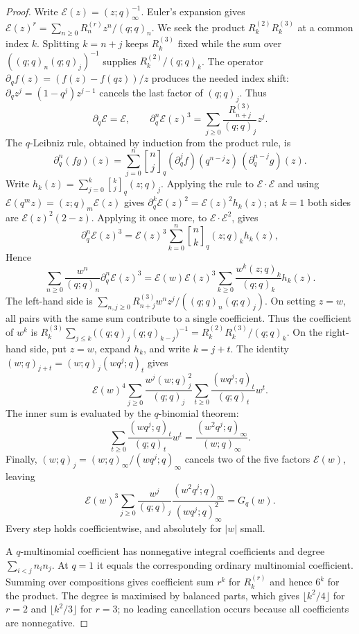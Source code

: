 \documentclass[11pt]{article}
\begin{document}
\begin{proof}
Write $\mathcal E(z)=(z;q)_\infty^{-1}$. Euler's expansion gives
$\mathcal E(z)^r=\sum_{n\ge0}R_n^{(r)}z^n/(q;q)_n$.
We seek the product $R_k^{(2)}R_k^{(3)}$ at a common index $k$.
Splitting $k=n+j$ keeps $R_k^{(3)}$ fixed while the sum over
$((q;q)_n(q;q)_j)^{-1}$ supplies $R_k^{(2)}/(q;q)_k$.
The operator $\partial_qf(z)=(f(z)-f(qz))/z$ produces the needed
index shift: $\partial_qz^j=(1-q^j)z^{j-1}$ cancels the last
factor of $(q;q)_j$. Thus
\[
 \partial_q\mathcal E=\mathcal E,\qquad
 \partial_q^n\mathcal E(z)^3
 =\sum_{j\ge0}\frac{R_{n+j}^{(3)}}{(q;q)_j}z^j.
\]
The $q$-Leibniz rule, obtained by induction from the product rule, is
\[
 \partial_q^n(fg)(z)=\sum_{j=0}^n\genfrac{[}{]}{0pt}{}{n}{j}_q
 (\partial_q^jf)(q^{n-j}z)\,(\partial_q^{n-j}g)(z).
\]
Write $h_k(z)=\sum_{j=0}^k\genfrac{[}{]}{0pt}{}{k}{j}_q(z;q)_j$. Applying the
rule to $\mathcal E\cdot\mathcal E$ and using
$\mathcal E(q^mz)=(z;q)_m\mathcal E(z)$ gives
$\partial_q^k\mathcal E(z)^2=\mathcal E(z)^2h_k(z)$; at $k=1$ both sides are
$\mathcal E(z)^2(2-z)$. Applying it once more, to
$\mathcal E\cdot\mathcal E^2$, gives
\[
 \partial_q^n\mathcal E(z)^3
 =\mathcal E(z)^3\sum_{k=0}^n\genfrac{[}{]}{0pt}{}{n}{k}_q(z;q)_kh_k(z),
\]
Hence
\[
 \sum_{n\ge0}\frac{w^n}{(q;q)_n}\partial_q^n\mathcal E(z)^3
 =\mathcal E(w)\mathcal E(z)^3
  \sum_{k\ge0}\frac{w^k(z;q)_k}{(q;q)_k}h_k(z).
\]
The left-hand side is
$\sum_{n,j\ge0}R_{n+j}^{(3)}w^nz^j/((q;q)_n(q;q)_j)$.
On setting $z=w$, all pairs with the same sum contribute to a
single coefficient. Thus the coefficient of $w^k$ is
$R_k^{(3)}\sum_{j\le k}\bigl((q;q)_j(q;q)_{k-j}\bigr)^{-1}
=R_k^{(2)}R_k^{(3)}/(q;q)_k$.
On the right-hand side, put $z=w$, expand $h_k$, and write
$k=j+t$. The identity $(w;q)_{j+t}=(w;q)_j(wq^j;q)_t$ gives
\[
 \mathcal E(w)^4\sum_{j\ge0}\frac{w^j(w;q)_j^2}{(q;q)_j}
       \sum_{t\ge0}\frac{(wq^j;q)_t}{(q;q)_t}w^t.
\]
The inner sum is evaluated by the $q$-binomial theorem:
\[
 \sum_{t\ge0}\frac{(wq^j;q)_t}{(q;q)_t}w^t
 =\frac{(w^2q^j;q)_\infty}{(w;q)_\infty}.
\]
Finally, $(w;q)_j=(w;q)_\infty/(wq^j;q)_\infty$ cancels two
of the five factors $\mathcal E(w)$, leaving
\[
 \mathcal E(w)^3\sum_{j\ge0}\frac{w^j}{(q;q)_j}
       \frac{(w^2q^j;q)_\infty}{(wq^j;q)_\infty^2}
 =G_q(w).
\]
Every step holds coefficientwise, and absolutely for $|w|$ small.

A $q$-multinomial coefficient has nonnegative integral coefficients and degree
$\sum_{i<j}n_in_j$. At $q=1$ it equals the corresponding ordinary
multinomial coefficient. Summing over compositions gives coefficient sum $r^k$ for
$R_k^{(r)}$ and hence $6^k$ for the product. The degree is maximised by
balanced parts, which gives $\lfloor k^2/4\rfloor$ for $r=2$ and
$\lfloor k^2/3\rfloor$ for $r=3$; no leading cancellation occurs because all
coefficients are nonnegative.


\end{proof}
\end{document}

